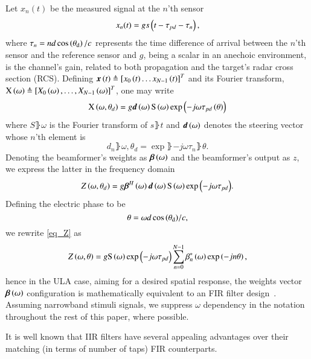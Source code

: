 \par Let $x_{n}(t)$ be the measured signal at the $n$'th sensor
\begin{equation}
x_{n}(t) = gs\left({t-\tau_{pd}-\tau_{n}}\right),
\label{eqn:noFeedbackULA_singleSensor_temporal}
\end{equation}
where $\tau_{n}=nd\cos\left({\theta_{\text{d}}}\right)/c$ represents the time difference of arrival between the $n$'th sensor and the reference sensor and $g$, being a scalar in an anechoic environment, is the channel's gain, related to both propagation and the target's radar cross section (RCS).
Defining $\boldsymbol{x}\left({t}\right)\triangleq\left[{x_{0}\left({t}\right)\hdots{}x_{N-1}\left({t}\right)}\right]^{T}$ and its Fourier transform, $\vecnot{\F{x}}\rBrace{\omega}\triangleq\vBrace{X_{0}\rBrace{\omega},\hdots,X_{N-1}\rBrace{\omega}}^{T}$, one may write 
\[
\vecnot{\F{x}}\rBrace{\omega,\theta_{d}}=g\vecnot{d}\rBrace{\omega}\F{s}\rBrace{\omega}\exp{\rBrace{-j\omega\tau_{pd}\rBrace{\theta}}}
\]
where $S\rBrace{\omega}$ is the Fourier transform of $s\rBrace{t}$ and $\boldsymbol{d}\left({\omega}\right)$ denotes the steering vector whose $n$'th element is
\begin{equation}
    \label{eq:d}
    d_{n}\rBrace{\omega,\theta_{d}} = \exp{\rBrace{-j\omega\tau_{n}\rBrace{\theta}}}.
\end{equation}
Denoting the beamformer's weights as $\boldsymbol{\beta}\left({\omega}\right)$ and the beamformer's output as $z$, we express the latter in the frequency domain
\begin{equation}
    \label{eq_Z}
    Z\rBrace{\omega,\theta_{d}} = g\vecnot{\beta}^{H}\rBrace{\omega}\vecnot{d}\rBrace{\omega}\F{s}\rBrace{\omega}\exp{\rBrace{-j\omega\tau_{pd}}}.
\end{equation}
Defining the electric phase to be
\begin{equation}\label{eq:thetaULA}
\theta=\omega{d\cos\left({\theta_{\text{d}}}\right)}/{c},
\end{equation}
we rewrite \eqref{eq_Z} as 
\[
Z\rBrace{\omega,\theta} = g\F{s}\rBrace{\omega}\exp{\rBrace{-j\omega\tau_{pd}}}\sum_{n=0}^{N-1}\beta^{*}_{n}\rBrace{\omega}\exp\Brack{-jn\theta},
\]
hence in the ULA case, aiming for a desired spatial response, the weights vector $\boldsymbol{\beta}\left({\omega}\right)$ configuration is mathematically equivalent to an FIR filter design~\cite{van1988beamforming,benesty2018}. 
Assuming narrowband stimuli signals, we suppress $\omega$ dependency in the notation throughout the rest of this paper, where possible.
\par It is well known \cite{rabiner1974some} that IIR filters have several appealing advantages over their matching (in terms of number of taps) FIR counterparts.
